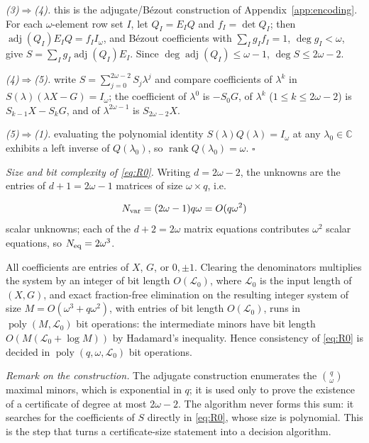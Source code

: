 \documentclass[journal]{IEEEtran}
\theoremstyle{plainn}
\theoremstyle{remark}
\begin{document}
\emph{(3)$\Rightarrow$(4).} this is the adjugate/B\'ezout construction of Appendix~\ref{app:encoding}. For each $\omega$-element row set $I$, let $Q_I=E_IQ$ and $f_I=\det Q_I$; then $\operatorname{adj}(Q_I)E_IQ=f_II_\omega$, and B\'ezout coefficients with $\sum_Ig_If_I=1$, $\deg g_I<\omega$, give $S=\sum_Ig_I\operatorname{adj}(Q_I)E_I$. Since $\deg\operatorname{adj}(Q_I)\le\omega-1$, $\deg S\le2\omega-2$.

\emph{(4)$\Rightarrow$(5).} write $S=\sum_{j=0}^{2\omega-2}S_j\lambda^j$ and compare coefficients of $\lambda^k$ in $S(\lambda)(\lambda X-G)=I_\omega$; the coefficient of $\lambda^0$ is $-S_0G$, of $\lambda^k$ ($1\le k\le2\omega-2$) is $S_{k-1}X-S_kG$, and of $\lambda^{2\omega-1}$ is $S_{2\omega-2}X$.

\emph{(5)$\Rightarrow$(1).} evaluating the polynomial identity $S(\lambda)Q(\lambda)=I_\omega$ at any $\lambda_0\in\mathbb C$ exhibits a left inverse of $Q(\lambda_0)$, so $\operatorname{rank}Q(\lambda_0)=\omega$. $\square$

\emph{Size and bit complexity of \eqref{eq:R0}.} Writing $d=2\omega-2$, the unknowns are the entries of $d+1=2\omega-1$ matrices of size $\omega\times q$, i.e.

\begin{equation}
N_{\rm var}=(2\omega-1)q\omega=O(q\omega^2)
\end{equation}
scalar unknowns; each of the $d+2=2\omega$ matrix equations contributes $\omega^2$ scalar equations, so $N_{\rm eq}=2\omega^3$.

All coefficients are entries of $X$, $G$, or $0,\pm1$. Clearing the denominators multiplies the system by an integer of bit length $O(\mathcal L_0)$, where $\mathcal L_0$ is the input length of $(X,G)$, and exact fraction-free elimination on the resulting integer system of size $M=O(\omega^3+q\omega^2)$, with entries of bit length $O(\mathcal L_0)$, runs in $\operatorname{poly}(M,\mathcal L_0)$ bit operations: the intermediate minors have bit length $O(M(\mathcal L_0+\log M))$ by Hadamard's inequality. Hence consistency of \eqref{eq:R0} is decided in $\operatorname{poly}(q,\omega,\mathcal L_0)$ bit operations.

\emph{Remark on the construction.} The adjugate construction enumerates the $\binom q\omega$ maximal minors, which is exponential in $q$; it is used only to prove the existence of a certificate of degree at most $2\omega-2$. The algorithm never forms this sum: it searches for the coefficients of $S$ directly in \eqref{eq:R0}, whose size is polynomial. This is the step that turns a certificate-size statement into a decision algorithm.
\end{document}
